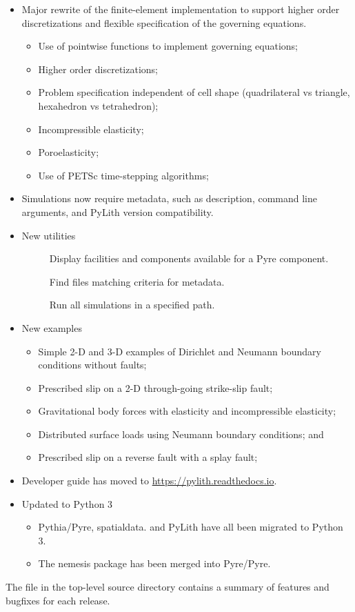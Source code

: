 \begin{itemize}
\item Major rewrite of the finite-element implementation to support
  higher order discretizations and flexible specification of the
  governing equations.
  \begin{itemize}
  \item Use of pointwise functions to implement governing equations;
  \item Higher order discretizations;
  \item Problem specification independent of cell shape (quadrilateral
    vs triangle, hexahedron vs tetrahedron);
  \item Incompressible elasticity;
  \item Poroelasticity;
  \item Use of PETSc time-stepping algorithms;
  \end{itemize}
\item Simulations now require metadata, such as description, command
  line arguments, and PyLith version compatibility.
\item New utilities
  \begin{description}
  \item[] Display facilities and components
    available for a Pyre component.
   \item[] Find  files matching
     criteria for metadata.
   \item[] Run all simulations in a specified path.
  \end{description}
\item New examples
  \begin{itemize}
  \item Simple 2-D and 3-D examples of Dirichlet and Neumann boundary
    conditions without faults;
  \item Prescribed slip on a 2-D through-going strike-slip fault;
  \item Gravitational body forces with elasticity and incompressible
    elasticity;
  \item Distributed surface loads using Neumann boundary conditions;
    and
  \item Prescribed slip on a reverse fault with a splay fault;
  \end{itemize}
\item Developer guide has moved to \url{https://pylith.readthedocs.io}.
\item Updated to Python 3
  \begin{itemize}
  \item Pythia/Pyre, spatialdata. and PyLith have all been migrated to
    Python 3.
  \item The nemesis package has been merged into Pyre/Pyre.
  \end{itemize}
\end{itemize}
The  file in the top-level source directory contains
a summary of features and bugfixes for each release.


